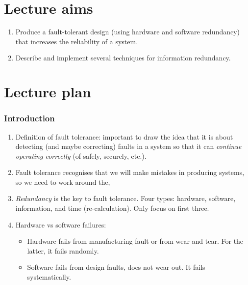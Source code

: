 \documentclass[11pt]{article}
\begin{document}
\section*{Lecture aims}

 \begin{enumerate}

 \item Produce a fault-tolerant design (using hardware and software redundancy) that increases the reliability of a system.

 \item Describe and implement several techniques for information redundancy.
 \end{enumerate}

\section*{Lecture plan}
  
\subsubsection*{Introduction}

\begin{enumerate}
  \item Definition of fault tolerance: important to draw the idea that it is about detecting (and maybe correcting) faults in a system so that it can \emph{continue operating correctly} (of safely, securely, etc.).

  \item Fault tolerance recognises that we will make mistakes in producing systems, so we need to work around the,

  \item \emph{Redundancy} is the key to fault tolerance. Four types: hardware, software, information, and time (re-calculation). Only focus on first three.

  \item Hardware vs software failures:

  \begin{itemize}
   \item Hardware fails from manufacturing fault or from wear and tear. For the latter, it fails randomly.
   \item Software fails from design faults, does not wear out. It fails systematically.
  \end{itemize}

 \end{enumerate}
\end{document}

